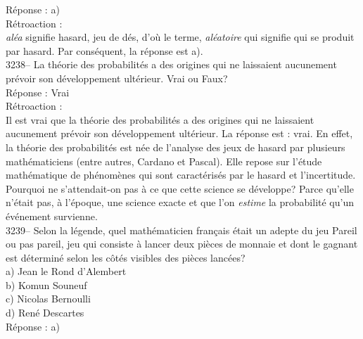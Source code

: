 \documentclass[letterpaper, 12pt]{article}
\begin{document}
R\'eponse : a)\\

R\'etroaction :\\
\emph{al\'ea} signifie \og hasard, jeu de d\'es\fg, d'o\`u le terme, \emph{al\'eatoire} qui signifie \og qui se produit par hasard\fg. Par cons\'equent, la r\'eponse est a).\\



3238-- La th\'eorie des probabilit\'es a des origines qui ne laissaient aucunement pr\'evoir son d\'eveloppement ult\'erieur.
Vrai ou Faux?\\

R\'eponse : Vrai\\

R\'etroaction :\\
Il est vrai que la th\'eorie des probabilit\'es a des origines qui ne laissaient aucunement pr\'evoir son d\'eveloppement ult\'erieur. La r\'eponse est : vrai. En effet, la th\'eorie des probabilit\'es est n\'ee de l'analyse des jeux de hasard par plusieurs math\'ematiciens (entre autres, Cardano et Pascal). Elle repose sur l'\'etude math\'ematique de ph\'enom\`enes qui sont caract\'eris\'es par le hasard et l'incertitude. Pourquoi ne s'attendait-on pas \`a ce que cette science se d\'eveloppe? Parce qu'elle n'\'etait pas, \`a l'\'epoque, une science exacte et que l'on \emph{estime} la probabilit\'e qu'un \'ev\'enement survienne.\\



3239-- Selon la l\'egende, quel math\'ematicien fran\c cais \'etait un adepte du jeu \og Pareil ou pas pareil\fg, jeu qui consiste \`a lancer deux pi\`eces de monnaie et dont le gagnant est d\'etermin\'e selon les c\^ot\'es visibles des pi\`eces lanc\'ees?\\

a) Jean le Rond d'Alembert\\
b) Komun Souneuf\\
c) Nicolas Bernoulli\\
d) Ren\'e Descartes\\

R\'eponse : a)\\
\end{document}
